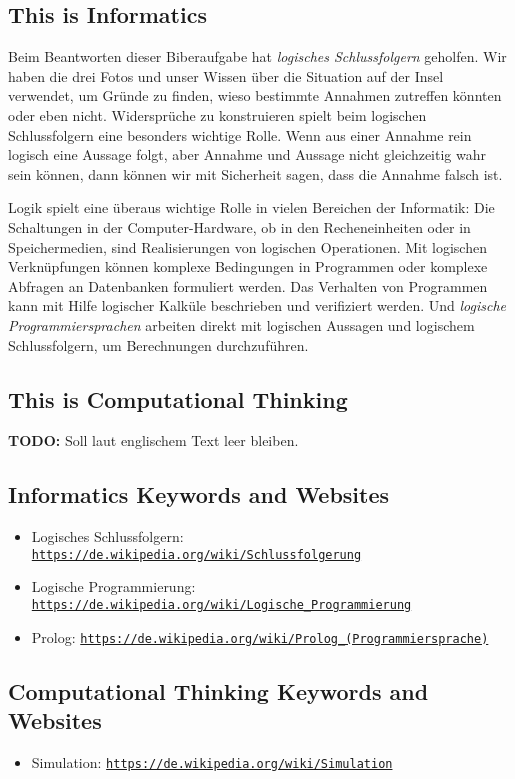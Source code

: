 \documentclass[a4paper,11pt]{report}
\newcommand{\BrochureUrlText}[1]{\texttt{#1}}
\begin{document}
\subsection*{This is Informatics}

Beim Beantworten dieser Biberaufgabe hat \emph{logisches Schlussfolgern} geholfen.
Wir haben die drei Fotos und unser Wissen über die Situation auf der Insel verwendet, um Gründe zu finden, wieso bestimmte Annahmen zutreffen könnten oder eben nicht.
Widersprüche zu konstruieren spielt beim logischen Schlussfolgern eine besonders wichtige Rolle.
Wenn aus einer Annahme rein logisch eine Aussage folgt, aber Annahme und Aussage nicht gleichzeitig wahr sein können, dann können wir mit Sicherheit sagen, dass die Annahme falsch ist.

Logik spielt eine überaus wichtige Rolle in vielen Bereichen der Informatik: Die Schaltungen in der Computer-Hardware, ob in den Recheneinheiten oder in Speichermedien, sind Realisierungen von logischen Operationen.  Mit logischen Verknüpfungen können komplexe Bedingungen in Programmen oder komplexe Abfragen an Datenbanken formuliert werden.  Das Verhalten von Programmen kann mit Hilfe logischer Kalküle beschrieben und verifiziert werden.  Und \emph{logische Programmiersprachen} arbeiten direkt mit logischen Aussagen und logischem Schlussfolgern, um Berechnungen durchzuführen.


\subsection*{This is Computational Thinking}

\textbf{TODO:} Soll laut englischem Text leer bleiben.


\subsection*{Informatics Keywords and Websites}

\begin{itemize}
  \item Logisches Schlussfolgern: \href{https://de.wikipedia.org/wiki/Schlussfolgerung}{\BrochureUrlText{https://de.wikipedia.org/wiki/Schlussfolgerung}}
  \item Logische Programmierung: \href{https://de.wikipedia.org/wiki/Logische_Programmierung}{\BrochureUrlText{https://de.wikipedia.org/wiki/Logische\_Programmierung}}
  \item Prolog: \href{https://de.wikipedia.org/wiki/Prolog_(Programmiersprache)}{\BrochureUrlText{https://de.wikipedia.org/wiki/Prolog\_(Programmiersprache)}}
\end{itemize}


\subsection*{Computational Thinking Keywords and Websites}

\begin{itemize}
  \item Simulation: \href{https://de.wikipedia.org/wiki/Simulation}{\BrochureUrlText{https://de.wikipedia.org/wiki/Simulation}}
\end{itemize}
\end{document}
